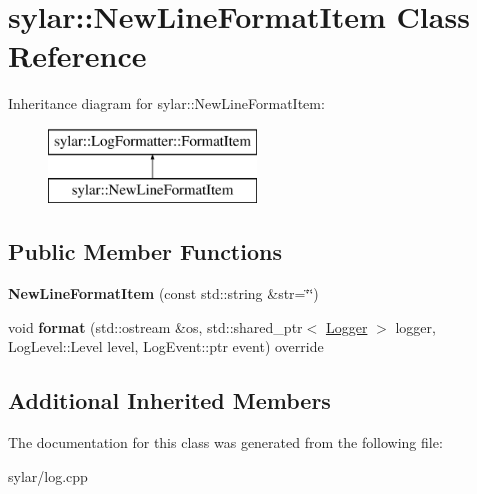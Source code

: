 \hypertarget{classsylar_1_1NewLineFormatItem}{\section{sylar\-:\-:New\-Line\-Format\-Item Class Reference}
\label{classsylar_1_1NewLineFormatItem}
}
Inheritance diagram for sylar\-:\-:New\-Line\-Format\-Item\-:\begin{figure}[H]
\begin{center}
\leavevmode
\includegraphics[height=2.000000cm]{classsylar_1_1NewLineFormatItem}
\end{center}
\end{figure}
\subsection*{Public Member Functions}
\begin{DoxyCompactItemize}
\item 
\hypertarget{classsylar_1_1NewLineFormatItem_a5b1ccf7afd2f744474668a82d2a67eb2}{{\bfseries New\-Line\-Format\-Item} (const std\-::string \&str=\char`\"{}\char`\"{})}\label{classsylar_1_1NewLineFormatItem_a5b1ccf7afd2f744474668a82d2a67eb2}

\item 
\hypertarget{classsylar_1_1NewLineFormatItem_aadf0d64a484cb263bde2a32b182ff716}{void {\bfseries format} (std\-::ostream \&os, std\-::shared\-\_\-ptr$<$ \hyperlink{classsylar_1_1Logger}{Logger} $>$ logger, Log\-Level\-::\-Level level, Log\-Event\-::ptr event) override}\label{classsylar_1_1NewLineFormatItem_aadf0d64a484cb263bde2a32b182ff716}

\end{DoxyCompactItemize}
\subsection*{Additional Inherited Members}


The documentation for this class was generated from the following file\-:\begin{DoxyCompactItemize}
\item 
sylar/log.\-cpp\end{DoxyCompactItemize}
